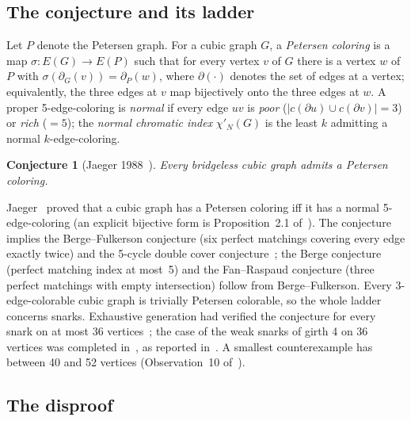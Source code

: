 \documentclass[11pt]{article}
\newtheorem{conjecture}[theorem]{Conjecture}
\theoremstyle{definition}
\theoremstyle{remark}
\newcommand{\PG}{P}
\begin{document}
\subsection{The conjecture and its ladder}

Let $\PG$ denote the Petersen graph. For a cubic graph $G$, a \emph{Petersen coloring} is a map
$\sigma : E(G) \to E(\PG)$ such that for every vertex $v$ of $G$ there is a vertex $w$ of $\PG$
with $\sigma(\partial_G(v)) = \partial_\PG(w)$, where $\partial(\cdot)$ denotes the set of edges
at a vertex; equivalently, the three edges at $v$ map bijectively onto the three edges at $w$.
A proper 5-edge-coloring is \emph{normal} if every edge $uv$ is \emph{poor}
($|c(\partial u) \cup c(\partial v)| = 3$) or \emph{rich} ($= 5$); the \emph{normal chromatic
index} $\chi'_N(G)$ is the least $k$ admitting a normal $k$-edge-coloring.

\begin{conjecture}[Jaeger 1988~\cite{Jaeger1988}]
Every bridgeless cubic graph admits a Petersen coloring.
\end{conjecture}

Jaeger~\cite{Jaeger1985} proved that a cubic graph has a Petersen coloring iff it has a normal
5-edge-coloring (an explicit bijective form is Proposition~2.1 of~\cite{Putman2026}). The
conjecture implies the Berge--Fulkerson conjecture (six perfect matchings covering every edge
exactly twice) and the 5-cycle double cover conjecture~\cite{GJMMMU2026, MazzMkrt2020}; the
Berge conjecture (perfect matching index at most~5) and the Fan--Raspaud conjecture (three
perfect matchings with empty intersection) follow from Berge--Fulkerson. Every 3-edge-colorable
cubic graph is trivially Petersen colorable, so the whole ladder concerns snarks. Exhaustive
generation had verified the conjecture for every snark on at most 36 vertices~\cite{BGHM2013};
the case of the weak snarks of girth 4 on 36 vertices was completed in~\cite{GMS2019}, as reported
in~\cite{GJMMM2026}. A smallest counterexample has between 40 and 52 vertices (Observation~10
of~\cite{GJMMMU2026}).

\subsection{The disproof}
\end{document}
